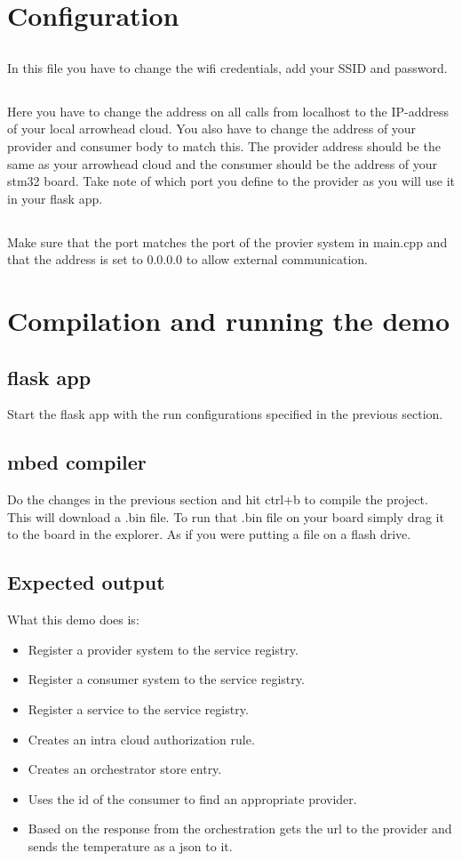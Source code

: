 \section*{Configuration} 
\subsection*{}
In this file you have to change the wifi credentials, add your SSID and password. 
\subsection*{} 
Here you have to change the address on all calls from localhost to the IP-address of your local arrowhead cloud. You also have to change the address of your provider and consumer body to match this. The provider address should be the same as your arrowhead cloud and the consumer should be the address of your stm32 board. Take note of which port you define to the provider as you will use it in your flask app.
\subsection*{}
Make sure that the port matches the port of the provier system in main.cpp and that the address is set to 0.0.0.0 to allow external communication. 
\section*{Compilation and running the demo}
\subsection*{flask app}
Start the flask app with the run configurations specified in the previous section.
\subsection*{mbed compiler}
Do the changes in the previous section and hit ctrl+b to compile the project. This will download a .bin file. To run that .bin file on your board simply drag it to the board in the explorer. As if you were putting a file on a flash drive.
\subsection*{Expected output}
What this demo does is:
\begin{itemize}
    \item Register a provider system to the service registry.
    \item Register a consumer system to the service registry.
    \item Register a service to the service registry.
    \item Creates an intra cloud authorization rule.
    \item Creates an orchestrator store entry.
    \item Uses the id of the consumer to find an appropriate provider.
    \item Based on the response from the orchestration gets the url to the provider and sends the temperature as a json to it. 
\end{itemize}